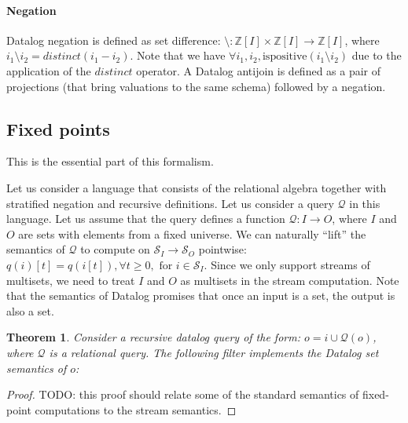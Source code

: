 \documentclass[10pt]{article}
\newtheorem{theorem}{Theorem}[section]
\newcommand{\Z}{\mathbb{Z}}  %
\newcommand{\stream}[1]{\ensuremath{\mathcal{S}_{#1}}}
\newcommand{\zm}{\ensuremath{z^{-1}}} %
\newcommand{\D}{\mathcal{D}}  %
\newcommand{\distinct}{\mathit{distinct}}  %
\newcommand{\q}{\ensuremath{\mathcal{Q}}}  %
\newcommand{\ispositive}{\mbox{ispositive}}
\begin{document}
\paragraph{Negation} Datalog negation is defined as set difference:
$\setminus: \Z[I] \times \Z[I] \rightarrow \Z[I]$, where $i_1
\setminus i_2 = \distinct(i_1 - i_2)$.  Note that we have $\forall
i_1, i_2, \ispositive(i_1 \setminus i_2)$ due to the application of
the $\distinct$ operator.  A Datalog antijoin is defined as a pair of
projections (that bring valuations to the same schema) followed by a
negation.

\subsection{Fixed points}

This is the essential part of this formalism.

Let us consider a language that consists of the relational algebra
together with stratified negation and recursive definitions.  Let us
consider a query $\q$ in this language.  Let us assume that the query
defines a function $\q : I \rightarrow O$, where $I$ and $O$ are sets
with elements from a fixed universe.  We can naturally ``lift'' the
semantics of $\q$ to compute on $\stream{I} \rightarrow \stream{O}$
pointwise: $q(i)[t] = q(i[t]), \forall t \geq 0, \mbox { for } i \in
\stream{I}$.  Since we only support streams of multisets, we need to
treat $I$ and $O$ as multisets in the stream computation.  Note that
the semantics of Datalog promises that once an input is a set, the
output is also a set.

\begin{theorem}
Consider a recursive datalog query of the form: $o = i \cup \q(o)$,
where $\q$ is a relational query.  The following filter implements the
Datalog set semantics of $o$:

\end{theorem}
\begin{proof}
  TODO: this proof should relate some of the standard semantics of
  fixed-point computations to the stream semantics.
\end{proof}
\end{document}
